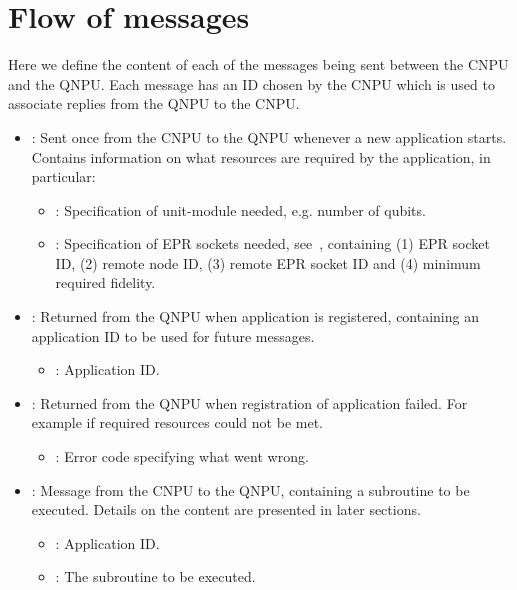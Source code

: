 \section{Flow of messages}
\label{sec:app-messages}
Here we define the content of each of the messages being sent between the \ac{CNPU} and the \ac{QNPU}.
Each message has an ID chosen by the \ac{CNPU} which is used to associate replies from the \ac{QNPU} to the \ac{CNPU}.
\begin{itemize}
  \item {}:
        Sent once from the \ac{CNPU} to the \ac{QNPU} whenever a new application starts.
        Contains information on what resources are required by the application, in particular:
        \begin{itemize}
            \item {}: Specification of unit-module needed, e.g. number of qubits.
            \item {}: Specification of EPR sockets needed, see~\cite{kozlowski2020networklayer}, containing
                (1) EPR socket ID,
                (2) remote node ID,
                (3) remote EPR socket ID and
                (4) minimum required fidelity.
        \end{itemize}
  \item {}:
            Returned from the \ac{QNPU} when application is registered, containing an application ID to be used for future messages.
            \begin{itemize}
                \item {}: Application ID.
            \end{itemize}
  \item {}:
        Returned from the \ac{QNPU} when registration of application failed.
        For example if required resources could not be met.
        \begin{itemize}
            \item {}: Error code specifying what went wrong.
        \end{itemize}
  \item {}:
        Message from the \ac{CNPU} to the \ac{QNPU}, containing a subroutine to be executed.
        Details on the content are presented in later sections.
        \begin{itemize}
            \item {}: Application ID.
            \item {}: The subroutine to be executed.

\end{itemize}
\end{itemize}
